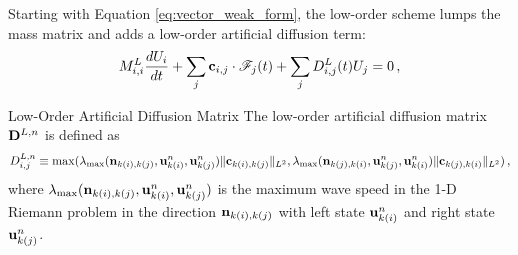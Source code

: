 Starting with Equation \eqref{eq:vector_weak_form}, the low-order scheme
lumps the mass matrix and adds a low-order artificial diffusion term:
\begin{equation}
   M^L_{i,i}\frac{dU_i}{dt}
     + \sum\limits_j\mathbf{c}_{i,j}\cdot\mathscr{F}_j(t)
     + \sum\limits_jD_{i,j}^{L}(t)U_j
     = 0 \,,
\end{equation}
\begin{definition}{Low-Order Artificial Diffusion Matrix}
   The low-order artificial diffusion matrix $\loworderdiffusionmatrix[\timeindex]$
   is defined as
   \begin{equation}\label{eq:low_order_diffusion_matrix_system}
     D_{i,j}^{L,n} \equiv
       \max(\lambda_{\text{max}}(\mathbf{n}_{k(i),k(j)},
         \mathbf{u}_{k(i)}^n,
         \mathbf{u}_{k(j)}^n)
         \|\mathbf{c}_{k(i),k(j)}\|_{L^2},
         \lambda_{\text{max}}(\mathbf{n}_{k(j),k(i)},
         \mathbf{u}_{k(j)}^n,
         \mathbf{u}_{k(i)}^n)
         \|\mathbf{c}_{k(j),k(i)}\|_{L^2}
       )
     \,,
   \end{equation}
  where $\lambda_{\text{max}}(\mathbf{n}_{k(i),k(j)},
         \mathbf{u}_{k(i)}^n,
         \mathbf{u}_{k(j)}^n)$
  is the maximum wave speed in the 1-D Riemann problem in the direction
  $\mathbf{n}_{k(i),k(j)}$ with left state
  $\mathbf{u}_{k(i)}^n$ and right state
  $\mathbf{u}_{k(j)}^n$.
\end{definition}
